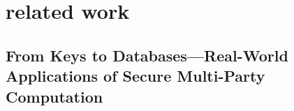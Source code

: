 \section {related work}
\subsection{From Keys to Databases—Real-World
	Applications of Secure Multi-Party
	Computation}


